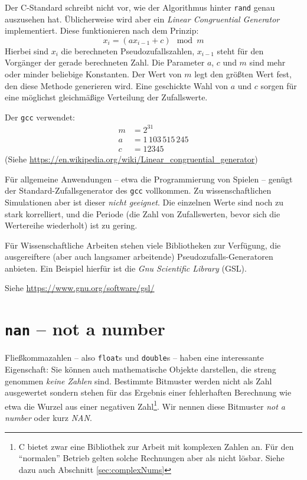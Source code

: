 \begin{hintbox}
Der C-Standard schreibt nicht vor, wie der Algorithmus hinter \texttt{rand} genau auszusehen hat. Üblicherweise wird aber ein \emph{Linear Congruential Generator} implementiert. Diese funktionieren nach dem Prinzip:
\[ x_i = (a x_{i-1} + c) \mod m \]
Hierbei sind $x_i$ die berechneten Pseudozufallszahlen, \ie $x_{i-1}$ steht für den Vorgänger der gerade berechneten Zahl. Die Parameter $a$, $c$ und $m$ sind mehr oder minder beliebige Konstanten. Der Wert von $m$ legt den größten Wert fest, den diese Methode generieren wird. Eine geschickte Wahl von $a$ und $c$ sorgen für eine möglichst gleichmäßige Verteilung der Zufallswerte.

Der \texttt{gcc} verwendet:
\begin{align*}
	m &= 2^{31}\\
	a &= 1\,103\,515\,245\\
	c &= 12345
\end{align*}
(Siehe \url{https://en.wikipedia.org/wiki/Linear_congruential_generator})
\end{hintbox}

\begin{warnbox}
Für allgemeine Anwendungen -- etwa die Programmierung von Spielen -- genügt der Standard-Zufallsgenerator des \texttt{gcc} vollkommen. Zu wissenschaftlichen Simulationen aber ist dieser \emph{nicht geeignet}. Die einzelnen Werte sind noch zu stark korrelliert, und die Periode (\ie die Zahl von Zufallswerten, bevor sich die Wertereihe wiederholt) ist zu gering.

Für Wissenschaftliche Arbeiten stehen viele Bibliotheken zur Verfügung, die ausgereiftere (aber auch langsamer arbeitende) Pseudozufalls-Generatoren anbieten. Ein Beispiel hierfür ist die \emph{Gnu Scientific Library} (GSL).

Siehe \url{https://www.gnu.org/software/gsl/}
\end{warnbox}

\section{\texttt{nan} -- not a number} \label{sec:NAN}
Fließkommazahlen -- also \texttt{float}s und \texttt{double}s -- haben eine interessante Eigenschaft: Sie können auch mathematische Objekte darstellen, die streng genommen \emph{keine Zahlen} sind. Bestimmte Bitmuster werden nicht als Zahl ausgewertet sondern stehen für das Ergebnis einer fehlerhaften Berechnung wie etwa die Wurzel aus einer negativen Zahl\footnote{C bietet zwar eine Bibliothek zur Arbeit mit komplexen Zahlen an. Für den \enquote{normalen} Betrieb gelten solche Rechnungen aber als nicht lösbar. Siehe dazu auch Abschnitt \ref{sec:complexNums}}. Wir nennen diese Bitmuster \emph{not a number} oder kurz \emph{NAN}.

